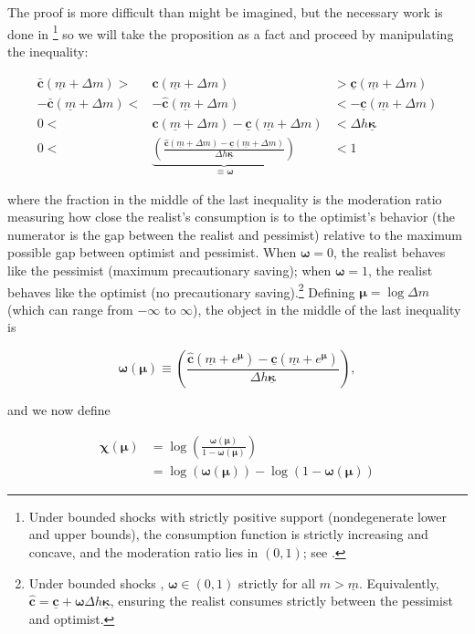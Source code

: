 \documentclass[twocolumn, switch]{article}
\newcommand{\mNrm}{m}
\newcommand{\cFunc}{\mathbf{c}}
\newcommand{\cFuncOpt}{\bar{\cFunc}}
\newcommand{\hNrm}{h}
\newcommand{\MPC}{\boldsymbol{\kappa}}
\newcommand{\MPCmin}{\underline{\MPC}}
\newcommand{\mNrmMin}{\underline{\mNrm}}
\newcommand{\logmNrmEx}{\boldsymbol{\mu}}
\newcommand{\modRte}{\boldsymbol{\omega}}
\newcommand{\mNrmEx}{\Delta \mNrm}
\newcommand{\hNrmEx}{\Delta \hNrm}
\newcommand{\cFuncPes}{\underline{\cFunc}}
\newcommand{\cFuncReal}{\hat{\cFunc}}
\newcommand{\logitModRte}{\boldsymbol{\chi}}
\begin{document}
The proof is more difficult than might be imagined, but the necessary work is
done in \citet{CarrollShanker2024}\footnote{Under bounded shocks with strictly positive support (nondegenerate lower and upper bounds), the consumption function is strictly increasing and concave, and the moderation ratio lies in $(0,1)$; see \citet{CarrollShanker2024}.} so we will take the proposition as
a fact and proceed by manipulating the inequality:

\begin{equation}
\begin{array}{rcl}
\cFuncOpt(\mNrmMin+\mNrmEx) > & \cFuncReal(\mNrmMin+\mNrmEx) & > \cFuncPes(\mNrmMin+\mNrmEx) \\
-\cFuncOpt(\mNrmMin+\mNrmEx) < & -\cFuncReal(\mNrmMin+\mNrmEx) & < -\cFuncPes(\mNrmMin+\mNrmEx) \\
0 < & \cFuncReal(\mNrmMin+\mNrmEx)-\cFuncPes(\mNrmMin+\mNrmEx) & < \hNrmEx \MPCmin \\
0 < & \underbrace{\left(\frac{\cFuncReal(\mNrmMin+\mNrmEx)-\cFuncPes(\mNrmMin+\mNrmEx)}{\hNrmEx \MPCmin}\right)}_{\equiv \modRte} & < 1
\end{array}
\end{equation}

where the fraction in the middle of the last inequality is the moderation ratio
measuring how close the realist's consumption is to the optimist's behavior
(the numerator is the gap between the realist and pessimist) relative to the
maximum possible gap between optimist and pessimist. When $\modRte=0$, the
realist behaves like the pessimist (maximum precautionary saving); when
$\modRte=1$, the realist behaves like the optimist (no precautionary saving).\footnote{Under bounded shocks \citep{CarrollKimball1996, CarrollShanker2024}, $\modRte\in(0,1)$ strictly for all $\mNrm > \mNrmMin$. Equivalently, $\cFuncReal = \cFuncPes + \modRte\hNrmEx \MPCmin$, ensuring the realist consumes strictly between the pessimist and optimist.} Defining
$\logmNrmEx = \log \mNrmEx$ (which can range from $-\infty$ to
$\infty$), the object in the middle of the last inequality is

\begin{equation}
\label{eq:modRte}
\modRte(\logmNrmEx) \equiv  \left(\frac{\cFuncReal(\mNrmMin+e^{\logmNrmEx})-\cFuncPes(\mNrmMin+e^{\logmNrmEx})}{\hNrmEx \MPCmin}\right),
\end{equation}

and we now define

\begin{equation}
\label{eq:chi}
\begin{aligned}
\logitModRte(\logmNrmEx) &= \log \left(\frac{\modRte(\logmNrmEx)}{1-\modRte(\logmNrmEx)}\right) \\
&= \log(\modRte(\logmNrmEx)) - \log(1-\modRte(\logmNrmEx))
\end{aligned}
\end{equation}
\end{document}
